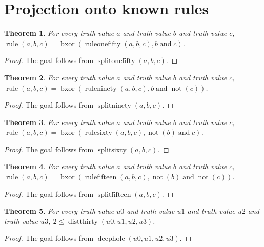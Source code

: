 \documentclass[11pt]{article}
\newtheorem{theorem}{Theorem}[section]
\theoremstyle{definition}
\begin{document}
\section{Projection onto known rules}
\label{ll:paper:known-rules}
\begin{theorem}
\label{ll:paper:split-onefifty}
For every truth value \(a\) and truth value \(b\) and truth value \(c\), \(\operatorname{rule}(a, b, c) = \operatorname{bxor}(\operatorname{ruleonefifty}(a, b, c), b \operatorname{and} c)\).
\end{theorem}
\begin{proof}
The goal follows from \(\operatorname{splitonefifty}(a, b, c)\).
\end{proof}
\begin{theorem}
\label{ll:paper:split-ninety}
For every truth value \(a\) and truth value \(b\) and truth value \(c\), \(\operatorname{rule}(a, b, c) = \operatorname{bxor}(\operatorname{ruleninety}(a, b, c), b \operatorname{and} \operatorname{not}(c))\).
\end{theorem}
\begin{proof}
The goal follows from \(\operatorname{splitninety}(a, b, c)\).
\end{proof}
\begin{theorem}
\label{ll:paper:split-sixty}
For every truth value \(a\) and truth value \(b\) and truth value \(c\), \(\operatorname{rule}(a, b, c) = \operatorname{bxor}(\operatorname{rulesixty}(a, b, c), \operatorname{not}(b) \operatorname{and} c)\).
\end{theorem}
\begin{proof}
The goal follows from \(\operatorname{splitsixty}(a, b, c)\).
\end{proof}
\begin{theorem}
\label{ll:paper:split-fifteen}
For every truth value \(a\) and truth value \(b\) and truth value \(c\), \(\operatorname{rule}(a, b, c) = \operatorname{bxor}(\operatorname{rulefifteen}(a, b, c), \operatorname{not}(b) \operatorname{and} \operatorname{not}(c))\).
\end{theorem}
\begin{proof}
The goal follows from \(\operatorname{splitfifteen}(a, b, c)\).
\end{proof}
\begin{theorem}
\label{ll:paper:deep-hole}
For every truth value \(u0\) and truth value \(u1\) and truth value \(u2\) and truth value \(u3\), \(2 \le \operatorname{distthirty}(u0, u1, u2, u3)\).
\end{theorem}
\begin{proof}
The goal follows from \(\operatorname{deephole}(u0, u1, u2, u3)\).
\end{proof}
\end{document}
